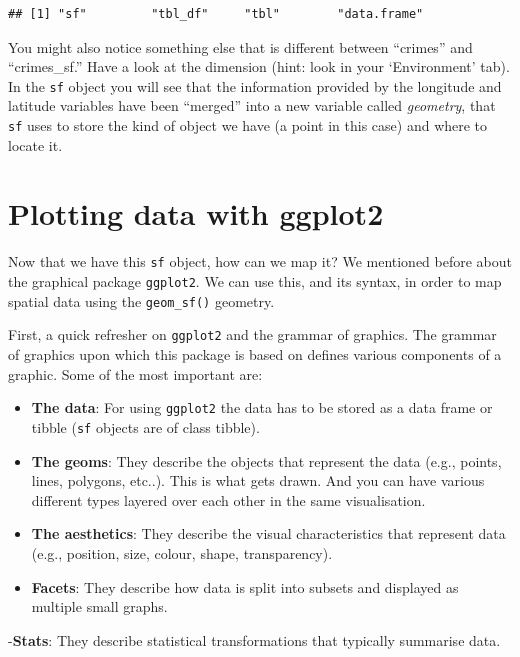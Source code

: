 \documentclass[
  krantz2]{krantz}
\begin{document}
\begin{verbatim}
## [1] "sf"         "tbl_df"     "tbl"        "data.frame"
\end{verbatim}

You might also notice something else that is different between ``crimes'' and ``crimes\_sf.'' Have a look at the dimension (hint: look in your `Environment' tab). In the \texttt{sf} object you will see that the information provided by the longitude and latitude variables have been ``merged'' into a new variable called \emph{geometry}, that \texttt{sf} uses to store the kind of object we have (a point in this case) and where to locate it.

\hypertarget{plotting-data-with-ggplot2}{%
\section{Plotting data with ggplot2}\label{plotting-data-with-ggplot2}}

Now that we have this \texttt{sf} object, how can we map it? We mentioned before about the graphical package \texttt{ggplot2}. We can use this, and its syntax, in order to map spatial data using the \texttt{geom\_sf()} geometry.

First, a quick refresher on \texttt{ggplot2} and the grammar of graphics. The grammar of graphics upon which this package is based on defines various components of a graphic. Some of the most important are:

\begin{itemize}
\item
  \textbf{The data}: For using \texttt{ggplot2} the data has to be stored as a data frame or tibble (\texttt{sf} objects are of class tibble).
\item
  \textbf{The geoms}: They describe the objects that represent the data (e.g., points, lines, polygons, etc..). This is what gets drawn. And you can have various different types layered over each other in the same visualisation.
\item
  \textbf{The aesthetics}: They describe the visual characteristics that represent data (e.g., position, size, colour, shape, transparency).
\item
  \textbf{Facets}: They describe how data is split into subsets and displayed as multiple small graphs.
\end{itemize}

-\textbf{Stats}: They describe statistical transformations that typically summarise data.
\end{document}
